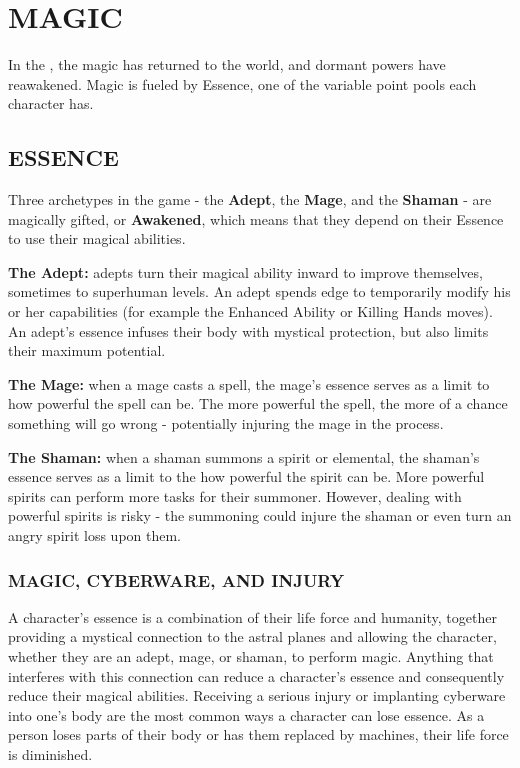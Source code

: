 \documentclass[oneside,10pt]{article}
\begin{document}
\section{MAGIC}
\begin{multicols}{2}
In the \SW{}, the magic has returned to the world,
and dormant powers have reawakened. Magic is fueled by
Essence, one of the variable point pools each character has.

\subsection{ESSENCE}
Three archetypes in the game - the \textbf{Adept}, the \textbf{Mage}, and
the \textbf{Shaman} - are magically gifted, or \textbf{Awakened}, which means that they
depend on their Essence to use their
magical abilities.
\begin{adjustwidth*}{.5cm}{.5cm}
\textbf{The Adept:} adepts turn their magical ability inward to improve themselves, sometimes to superhuman levels. An
adept spends edge to temporarily modify his or her
capabilities (for example the Enhanced Ability or Killing
Hands moves). An adept's essence infuses their body with mystical protection, but also limits their maximum potential.

\textbf{The Mage:} when a mage casts a spell, the mage's essence serves as a limit to how powerful the spell can be. The more powerful the spell, the more of a chance something will go wrong - potentially injuring the mage in the process.

\textbf{The Shaman:} when a shaman summons
a spirit or elemental, the shaman's essence serves as a limit to the how powerful the spirit can be. More powerful spirits can perform more tasks for their summoner. However, dealing with powerful spirits is risky - the summoning could injure the shaman or even turn an angry spirit loss upon them.
\end{adjustwidth*}

\subsubsection{MAGIC, CYBERWARE, AND INJURY}

A character's essence is a combination of their life force and humanity, together providing a mystical connection to the astral planes and allowing the character, whether they are an adept, mage, or shaman, to perform magic. Anything that interferes with this connection can reduce a character's essence and consequently reduce their magical abilities. Receiving a serious injury or implanting cyberware into one's body are the most common ways a character can lose essence. As a person loses parts of their body or has them replaced by machines, their life force is diminished. 


\end{multicols}
\end{document}
